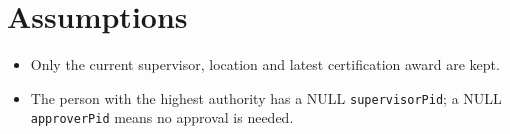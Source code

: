 \documentclass[11pt,a4paper]{article}
\begin{document}
\section{Assumptions}
\begin{itemize}
  \item Only the current supervisor, location and latest certification award are kept.
  \item The person with the highest authority has a NULL \texttt{supervisorPid}; a NULL \texttt{approverPid} means no approval is needed.
\end{itemize}
\end{document}
